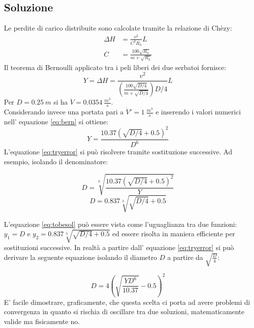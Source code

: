 \documentclass[oneside]{article}
\begin{document}
\subsection*{Soluzione}
Le perdite di carico distribuite sono calcolate tramite la relazione di Chèzy:
\begin{align}
   \Delta H &= \frac{v^2}{C^2 R_h}L \\
   C &= \frac{100 \sqrt{R_h}}{m + \sqrt{R_h}}
\end{align}
Il teorema di Bernoulli applicato tra i peli liberi dei due serbatoi fornisce:
\begin{equation}
   \label{eq:bern}
   Y = \Delta H = \frac{v^2}{\left(\frac{100\sqrt{D/4}}{m + \sqrt{D/4}}\right)D/4}L
\end{equation}
Per $D = 0.25 \: m$ si ha $\dot{V} = 0.0354 \: \frac{m^3}{s}$.\\
Considerando invece una portata pari a $\dot{V}' = 1 \: \frac{m^3}{s}$ e inserendo i
valori numerici nell' equazione \ref{eq:bern} si ottiene:
\begin{equation}
   \label{eq:tryerror}
   Y = \frac{10.37 \left(\sqrt{D/4} + 0.5\right)^2}{D^6}
\end{equation}
L'equazione \ref{eq:tryerror} si può risolvere tramite sostituzione successive. Ad
esempio, isolando il denominatore:

\begin{equation}
   D = \sqrt[6]{\frac{10.37 \left(\sqrt{D/4} + 0.5\right)^2}{Y}}
\end{equation}
\begin{equation}
   \label{eq:tobesol}
   D = 0.837 \sqrt[3]{\sqrt{D/4} + 0.5}
\end{equation}

L'equazione \ref{eq:tobesol} può essere vista come l'uguaglianza tra due funzioni: $y_1 =
D$ e $y_2 = 0.837\sqrt[3]{\sqrt{D/4} + 0.5}$ ed essere risolta in maniera efficiente per
sostituzioni successive. In realtà a partire dall' equazione \ref{eq:tryerror} si può
derivare la seguente equazione isolando il diametro $D$ a partire da
$\sqrt{\frac{D}{4}}$:

\begin{equation}
   D = 4 \left(\sqrt{\frac{Y D^6}{10.37}}- 0.5\right)^2
\end{equation}
E' facile dimostrare, graficamente, che questa scelta ci porta ad avere problemi di
convergenza in quanto si rischia di oscillare tra due soluzioni, matematicamente valide
ma fisicamente no.
\end{document}

